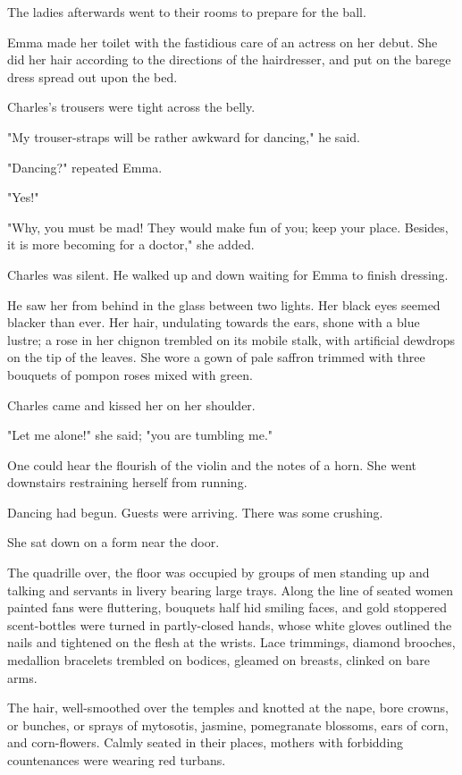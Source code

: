 \documentclass[11pt,twocolumn]{ltugboat}
\begin{document}
The ladies afterwards went to their rooms to prepare for the ball.

Emma made her toilet with the fastidious care of an actress on her
debut. She did her hair according to the directions of the hairdresser,
and put on the barege dress spread out upon the bed.

Charles's trousers were tight across the belly.

"My trouser-straps will be rather awkward for dancing," he said.

"Dancing?" repeated Emma.

"Yes!"

"Why, you must be mad! They would make fun of you; keep your place.
Besides, it is more becoming for a doctor," she added.

Charles was silent. He walked up and down waiting for Emma to finish
dressing.

He saw her from behind in the glass between two lights. Her black eyes
seemed blacker than ever. Her hair, undulating towards the ears, shone
with a blue lustre; a rose in her chignon trembled on its mobile stalk,
with artificial dewdrops on the tip of the leaves. She wore a gown of
pale saffron trimmed with three bouquets of pompon roses mixed with
green.

Charles came and kissed her on her shoulder.

"Let me alone!" she said; "you are tumbling me."

One could hear the flourish of the violin and the notes of a horn. She
went downstairs restraining herself from running.

Dancing had begun. Guests were arriving. There was some crushing.

She sat down on a form near the door.

The quadrille over, the floor was occupied by groups of men standing up
and talking and servants in livery bearing large trays. Along the line
of seated women painted fans were fluttering, bouquets half hid smiling
faces, and gold stoppered scent-bottles were turned in partly-closed
hands, whose white gloves outlined the nails and tightened on the flesh
at the wrists. Lace trimmings, diamond brooches, medallion bracelets
trembled on bodices, gleamed on breasts, clinked on bare arms.

The hair, well-smoothed over the temples and knotted at the nape,
bore crowns, or bunches, or sprays of mytosotis, jasmine, pomegranate
blossoms, ears of corn, and corn-flowers. Calmly seated in their places,
mothers with forbidding countenances were wearing red turbans.
\end{document}
